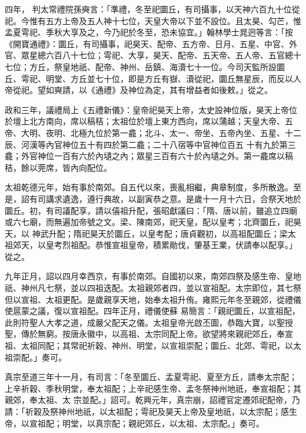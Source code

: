 \begin{pinyinscope}
 四年，
 判太常禮院孫奭言：「準禮，冬至祀圜丘，有司攝事，以天神六百九十位從祀。今惟有五方上帝及五人神十七位，天皇大帝以下並不設位。且太昊、勾芒，惟孟夏雩祀、季秋大享及之，今乃祀於冬至，恐未協宜。」翰林學士晁迥等言：「按《開寶通禮》：圜丘，有司攝事，祀昊天、配帝、五方帝、日月、五星、中官、外官、眾星總六百八十七位；雩祀、大享，昊天、配帝、五天帝、五人帝、五官總十七位；方丘，祭皇地祇、配帝、神州、岳鎮、海瀆七十一位。今司天監所設圜
 丘、雩祀、明堂、方丘並七十位，即是方丘有嶽、瀆從祀，圜丘無星辰，而反以人帝從祀。望如奭請，以《通禮》及神位為定，其有增益者如後敕。」從之。



 政和三年，議禮局上《五禮新儀》：皇帝祀昊天上帝，太史設神位版，昊天上帝位於壇上北方南向，席以稿秸；太祖位於壇上東方西向，席以蒲越；天皇大帝、五帝、大明、夜明、北極九位於第一龕；北斗、太一、帝坐、五帝內坐、五星、十二辰、河漢等內官神位五十有四於第二龕；二十八宿等中官神位百五
 十有九於第三龕；外官神位一百有六於內壝之內；眾星三百有六十於內壝之外。第一龕席以稿秸，餘以莞席，皆內向配位。



 太祖乾德元年，始有事於南郊。自五代以來，喪亂相繼，典章制度，多所散逸。至是，詔有司講求遺逸，遵行典故，以副寅恭之意。是歲十一月十六日，合祭天地於圜丘。初，有司議配享，請以僖祖升配，張昭獻議曰：「隋、唐以前，雖追立四廟或六七廟，而無遍加帝號之文。梁、陳南郊，祀天皇，配以皇考；北齊圜丘，祀昊天，以
 神武升配；隋祀昊天於圜丘，以皇考配；唐貞觀初，以高祖配圜丘；梁太祖郊天，以皇考烈祖配。恭惟宣祖皇帝，積累勛伐，肇基王業，伏請奉以配享。」從之。



 九年正月，詔以四月幸西京，有事於南郊。自國初以來，南郊四祭及感生帝、皇地祇、神州凡七祭，並以四祖迭配。太祖親郊者四，並以宣祖配。太宗即位，其七祭但以宣祖、太祖更配。是歲親享天地，始奉太祖升侑。雍熙元年冬至親郊，從禮儀使扈蒙之議，復以宣祖配。四年正月，禮儀使蘇
 易簡言：「親祀圜丘，以宣祖配，此則符聖人大孝之道，成嚴父配天之儀。太祖皇帝光啟丕圖，恭臨大寶，以聖授聖，傳於無窮。按唐永徽中，以高祖、太宗同配上帝。欲望將來親祀郊丘，奉宣祖、太祖同配；其常祀祈穀、神州、明堂，以宣祖崇配；圜丘、北郊、雩祀，以太祖崇配。」奏可。



 真宗至道三年十一月，有司言：「冬至圜丘、孟夏雩祀、夏至方丘，請奉太宗配；上辛祈穀、季秋明堂，奉太祖配；上辛祀感生帝、孟冬祭神州地祇，奉宣祖配；其親郊，奉太祖、太
 宗並配。」詔可。乾興元年，真宗崩，詔禮官定遷郊祀配帝，乃請：「祈穀及祭神州地祇，以太祖配；雩祀及昊天上帝及皇地祇，以太宗配；感生帝，以宣祖配；明堂，以真宗配；親祀郊丘，以太祖、太宗配。」奏可。




\end{pinyinscope}
